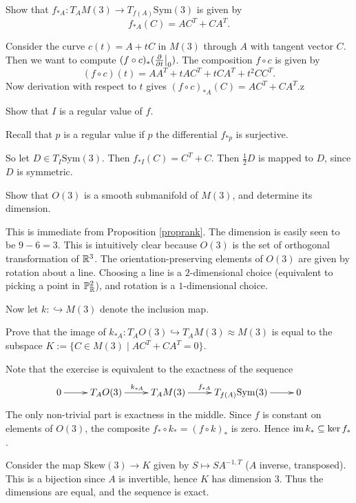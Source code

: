 \documentclass[11pt, english]{article}
\begin{document}
\begin{exc}
Show that $f_{\ast A}:T_AM(3) \to T_{f(A)}\mathrm{Sym}(3)$ is given by
\[
f_{\ast A}(C) = AC^T+CA^T.
\]
\end{exc}
\begin{sol}
Consider the curve $c(t)=A + tC$ in $M(3)$ through $A$ with tangent vector $C$. Then we want to compute $(f \circ c)_\ast (\restr{\dd{}{t}}{0})$. The composition $f \circ c$ is given by
\[
(f \circ c)(t) = AA^T+tAC^T+tCA^T+t^2CC^T.
\]
Now derivation with respect to $t$ gives $(f \circ c)_{\ast A}(C) = AC^T+CA^T$.z
\end{sol}

\begin{exc}
Show that $I$ is a regular value of $f$.
\end{exc}
\begin{sol}
Recall that $p$ is a regular value if $p$ the differential $f_{\ast p}$ is surjective.

So let $D \in T_{I}\mathrm{Sym}(3)$. Then $f_{\ast I}(C) = C^T+ C$. Then $\frac 12 D$ is mapped to $D$, since $D$ is symmetric.
\end{sol}

\begin{exc}
 Show that $O(3)$ is a smooth submanifold of $M(3)$, and determine its dimension.
\end{exc}
\begin{sol}
This is immediate from Proposition \ref{proprank}. The dimension is easily seen to be $9-6=3$. This is intuitively clear because $O(3)$ is the set of orthogonal transformation of $\mathbb{R}^3$. The orientation-preserving elements of $O(3)$ are given by rotation about a line. Choosing a line is a $2$-dimensional choice (equivalent to picking a point in $\mathbb{P}_{\mathbb{R}}^2$), and rotation is a $1$-dimensional choice. 
\end{sol}

Now let $k:\hookrightarrow M(3)$ denote the inclusion map. 
\begin{exc}
  Prove that the image of $k_{\ast A}:T_AO(3) \hookrightarrow T_AM(3) \approx M(3)$ is equal to the subspace $K:= \{ C \in M(3) \mid AC^T + CA^T=0 \}$. 
\end{exc}
\begin{sol}
Note that the exercise is equivalent to the exactness of the sequence
\[
\xymatrix{
0 \ar[r] & T_AO(3) \ar[r]^{k_{\ast A}} & T_AM(3) \ar[r]^{f_{\ast A}} & T_{f(A)}\mathrm{Sym}(3) \ar[r] & 0 
}
\]
The only non-trivial part is exactness in the middle. Since $f$ is constant on elements of $O(3)$, the composite $f_\ast \circ k_\ast = (f \circ k)_\ast$ is zero. Hence $\operatorname{im} k_\ast \subseteq \ker f_\ast$.

Consider the map $\mathrm{Skew}(3) \to K$ given by $S \mapsto SA^{-1,T}$ ($A$ inverse, transposed). This is a bijection since $A$ is invertible, hence $K$ has dimension $3$. Thus the dimensions are equal, and the sequence is exact.
\end{sol}
\end{document}
